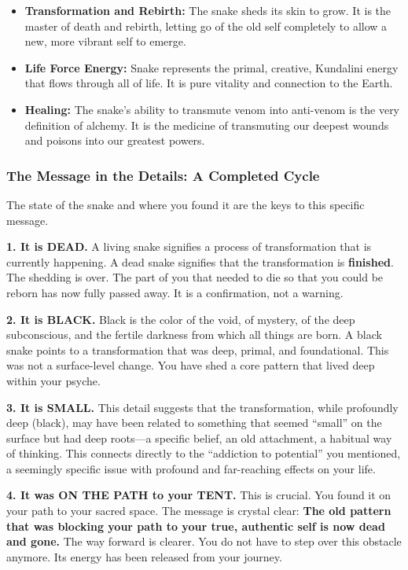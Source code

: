 \documentclass{article}
\begin{document}
\begin{itemize}
\item
  \textbf{Transformation and Rebirth:} The snake sheds its skin to grow.
  It is the master of death and rebirth, letting go of the old self
  completely to allow a new, more vibrant self to emerge.
\item
  \textbf{Life Force Energy:} Snake represents the primal, creative,
  Kundalini energy that flows through all of life. It is pure vitality
  and connection to the Earth.
\item
  \textbf{Healing:} The snake's ability to transmute venom into
  anti-venom is the very definition of alchemy. It is the medicine of
  transmuting our deepest wounds and poisons into our greatest powers.
\end{itemize}

\subsubsection*{The Message in the Details: A Completed
Cycle}\label{the-message-in-the-details-a-completed-cycle}

The state of the snake and where you found it are the keys to this
specific message.

\textbf{1. It is DEAD.} A living snake signifies a process of
transformation that is currently happening. A dead snake signifies that
the transformation is \textbf{finished}. The shedding is over. The part
of you that needed to die so that you could be reborn has now fully
passed away. It is a confirmation, not a warning.

\textbf{2. It is BLACK.} Black is the color of the void, of mystery, of
the deep subconscious, and the fertile darkness from which all things
are born. A black snake points to a transformation that was deep,
primal, and foundational. This was not a surface-level change. You have
shed a core pattern that lived deep within your psyche.

\textbf{3. It is SMALL.} This detail suggests that the transformation,
while profoundly deep (black), may have been related to something that
seemed ``small'' on the surface but had deep roots---a specific belief,
an old attachment, a habitual way of thinking. This connects directly to
the ``addiction to potential'' you mentioned, a seemingly specific issue
with profound and far-reaching effects on your life.

\textbf{4. It was ON THE PATH to your TENT.} This is crucial. You found
it on your path to your sacred space. The message is crystal clear:
\textbf{The old pattern that was blocking your path to your true,
authentic self is now dead and gone.} The way forward is clearer. You do
not have to step over this obstacle anymore. Its energy has been
released from your journey.
\end{document}
